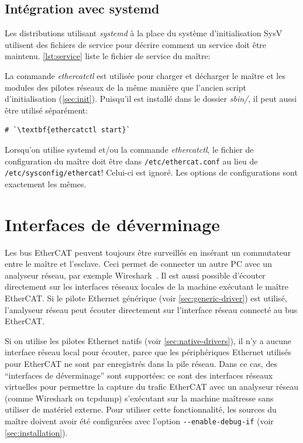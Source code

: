 \documentclass[a4paper,12pt,BCOR6mm,bibtotoc,idxtotoc]{scrbook}
\begin{document}
\subsection{Int\'egration avec systemd}
\label{sec:systemd}

Les distributions utilisant \textit{systemd} \`a la place du syst\`eme
d'initialisation SysV utilisent des fichiers de service pour d\'ecrire
comment un service doit \^etre maintenu.  \autoref{lst:service} liste
le fichier de service du ma\^itre:



La commande \textit{ethercatctl} est utilis\'ee pour charger et
d\'echarger le ma\^itre et les modules des pilotes r\'eseaux de la
m\^eme mani\`ere que l'ancien script d'initialisation
(\autoref{sec:init}). Puisqu'il est install\'e dans le dossier
\textit{sbin/}, il peut aussi \^etre utilis\'e s\'epar\'ement:

\begin{lstlisting}[gobble=2]
  # `\textbf{ethercatctl start}`
\end{lstlisting}

Lorsqu'on utilise systemd et/ou la commande \textit{ethercatctl}, le
fichier de configuration du ma\^itre doit \^etre dans
\texttt{/etc/ethercat.conf} au lieu de
\texttt{/etc/sysconfig/ethercat}!  Celui-ci est ignor\'e. Les options
de configurations sont exactement les m\^emes.


\section{Interfaces de d\'everminage}
\label{sec:debug}

Les bus EtherCAT peuvent toujours \^etre surveill\'es en ins\'erant un
commutateur entre le ma\^itre et l'esclave. Ceci permet de connecter
un autre PC avec un analyseur r\'eseau, par exemple
Wireshark~\cite{wireshark}.  Il est aussi possible d'\'ecouter
directement sur les interfaces r\'eseaux locales de la machine
ex\'ecutant le ma\^itre EtherCAT.  Si le pilote Ethernet g\'en\'erique
(voir \autoref{sec:generic-driver}) est utilis\'e, l'analyseur
r\'eseau peut \'ecouter directement sur l'interface r\'eseau
connect\'e au bus EtherCAT.

Si on utilise les pilotes Ethernet natifs (voir
\autoref{sec:native-drivers}), il n'y a aucune interface r\'eseau
local pour \'ecouter, parce que les p\'eriph\'eriques Ethernet
utilis\'es pour EtherCAT ne sont par enregistr\'es dans la pile
r\'eseau.  Dans ce cas, des ``interfaces de d\'everminage'' sont
support\'ees: ce sont des interfaces r\'eseaux virtuelles pour
permettre la capture du trafic EtherCAT avec un analyseur r\'eseau
(comme Wireshark ou tcpdump) s'ex\'ecutant sur la machine ma\^itresse
sans utiliser de mat\'eriel externe.  Pour utiliser cette
fonctionnalit\'e, les sources du ma\^itre doivent avoir \'et\'e
configur\'ees avec l'option \lstinline+--enable-debug-if+ (voir
\autoref{sec:installation}).
\end{document}
